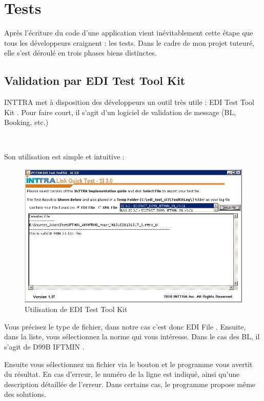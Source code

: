 \chapter{Tests}
\label{Tests}

Après l'écriture du code d'une application vient inévitablement cette étape que tous les développeurs craignent : les tests. Dans le cadre de mon projet tuteuré, elle s'est déroulé en trois phases biens distinctes.


\section{Validation par \og EDI Test Tool Kit \fg}
INTTRA met à disposition des développeurs un outil très utile : \og EDI Test Tool Kit \fg. Pour faire court, il s'agit d'un logiciel de validation de message (BL, Booking, etc.)

~

Son utilisation est simple et intuitive :
\begin{figure}[!ht]
	\begin{center}
		\includegraphics[scale=.85]{Contenu/ProjetTuteure/Images/EDI_Tools.png}
	\end{center}

	\caption{Utilisation de \og EDI Test Tool Kit \fg}
\end{figure}

Vous précisez le type de fichier, dans notre cas c'est donc \og EDI File \fg. Ensuite, dans la liste, vous sélectionnez la norme qui vous intéresse. Dans le cas des BL, il s'agit de \og D99B IFTMIN \fg.

Ensuite vous sélectionnez un fichier via le bouton et le programme vous avertit du résultat. En cas d'erreur, le numéro de la ligne est indiqué, ainsi qu'une description détaillée de l'erreur. Dans certains cas, le programme propose même des solutions.


